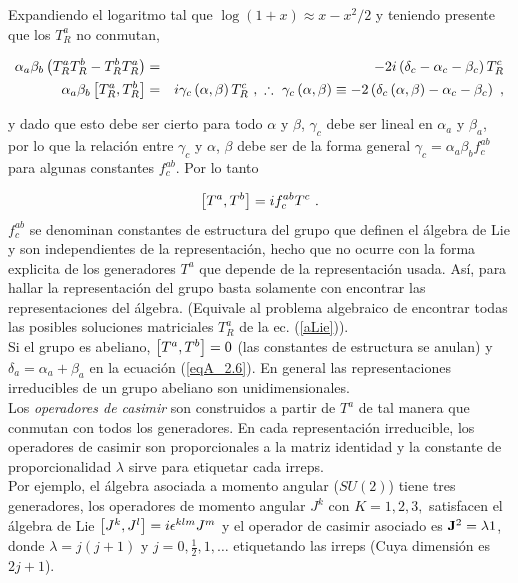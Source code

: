 Expandiendo el logaritmo tal que $\log \left( 1+x\right) \approx x-x^{2}/2$ y teniendo presente que los $T_{R}^{a}$ no conmutan,

\begin{eqnarray}
\alpha _{a}\beta _{b}\left( T_{R}^{a}T_{R}^{b}-T_{R}^{b}T_{R}^{a}\right) 
&=&-2i\left( \delta _{c}-\alpha _{c}-\beta _{c}\right) T_{R}^{c}  \notag \\
\alpha _{a}\beta _{b}\left[ T_{R}^{a},T_{R}^{b}\right]  &=&i\gamma
_{c}\left( \alpha ,\beta \right) T_{R}^{c}~,~\therefore ~\gamma _{c}\left(
\alpha ,\beta \right) \equiv -2\left( \delta _{c}\left( \alpha ,\beta
\right) -\alpha _{c}-\beta _{c}\right) ~,
\end{eqnarray}

y dado que esto debe ser cierto para todo $\alpha$ y $\beta$, $\gamma_{c}$ debe ser lineal en $\alpha_{a}$ y $\beta_{a}$, por lo que la relación entre $\gamma_{c}$ y $\alpha$, $\beta$ debe ser de la forma general $\gamma_{c}=\alpha_{a}\beta_{b}f^{ab}_{c}$ para algunas constantes $f^{ab}_{c}$. Por lo tanto

\begin{equation}
    \comm{T^{a}}{T^{b}}=if^{ab}_{c}T^{c}~.
\label{aLie}
\end{equation}
$f^{ab}_{c}$ se denominan constantes de estructura del grupo que definen el álgebra de Lie y son independientes de la representación, hecho que no ocurre con la forma explicita de los generadores $T^{a}$ que depende de la representación usada. Así, para hallar la representación del grupo basta solamente con encontrar las representaciones del álgebra. (Equivale al problema algebraico de encontrar todas las posibles soluciones matriciales $T^{a}_{R}$ de la ec. (\ref{aLie})).\\
Si el grupo es abeliano, $\comm{T^{a}}{T^{b}}=0$ (las constantes de estructura se anulan) y $\delta_{a}=\alpha_{a} + \beta_{a}$ en la ecuación (\ref{eqA_2.6}). En general las representaciones irreducibles de un grupo abeliano son unidimensionales.\\

Los \emph{operadores de casimir} son construidos a partir de $T^{a}$ de tal manera que conmutan con todos los generadores. En cada representación irreducible, los operadores de casimir son proporcionales a la matriz identidad y la constante de proporcionalidad $\lambda$ sirve para etiquetar cada irreps.\\
Por ejemplo, el álgebra asociada a momento angular ($SU(2)$) tiene tres generadores, los operadores de momento angular $J^{k}$ con $K=1,2,3,$ satisfacen el álgebra de Lie $\comm{J^{k}}{J^{l}}=i \epsilon ^{klm}J^{m}$ y el operador de casimir asociado es $\vb{J}^2=\lambda 1$, donde $\lambda=j(j+1)$ y $j=0,\frac{1}{2},1,\ldots$ etiquetando las irreps (Cuya dimensión es $2j+1$).\\

